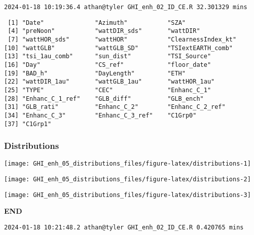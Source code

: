 \documentclass[
  10pt,
  a4paper,oneside]{article}
\begin{document}
\begin{verbatim}
2024-01-18 10:19:36.4 athan@tyler GHI_enh_02_ID_CE.R 32.301329 mins
\end{verbatim}

\begin{verbatim}
 [1] "Date"              "Azimuth"           "SZA"              
 [4] "preNoon"           "wattDIR_sds"       "wattDIR"          
 [7] "wattHOR_sds"       "wattHOR"           "ClearnessIndex_kt"
[10] "wattGLB"           "wattGLB_SD"        "TSIextEARTH_comb" 
[13] "tsi_1au_comb"      "sun_dist"          "TSI_Source"       
[16] "Day"               "CS_ref"            "floor_date"       
[19] "BAD_h"             "DayLength"         "ETH"              
[22] "wattDIR_1au"       "wattGLB_1au"       "wattHOR_1au"      
[25] "TYPE"              "CEC"               "Enhanc_C_1"       
[28] "Enhanc_C_1_ref"    "GLB_diff"          "GLB_ench"         
[31] "GLB_rati"          "Enhanc_C_2"        "Enhanc_C_2_ref"   
[34] "Enhanc_C_3"        "Enhanc_C_3_ref"    "C1Grp0"           
[37] "C1Grp1"           
\end{verbatim}

\newpage
\FloatBarrier

\hypertarget{distributions}{%
\subsubsection{Distributions}\label{distributions}}

\begin{center}\texttt{[image: GHI\_enh\_05\_distributions\_files/figure-latex/distributions-1]} \end{center}

\begin{center}\texttt{[image: GHI\_enh\_05\_distributions\_files/figure-latex/distributions-2]} \end{center}

\begin{center}\texttt{[image: GHI\_enh\_05\_distributions\_files/figure-latex/distributions-3]} \end{center}

\textbf{END}

\begin{verbatim}
2024-01-18 10:21:48.2 athan@tyler GHI_enh_02_ID_CE.R 0.420765 mins
\end{verbatim}
\end{document}
